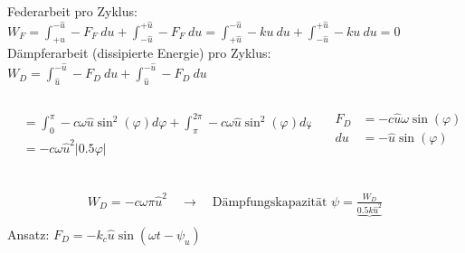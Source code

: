 \begin{frame}
        Federarbeit pro Zyklus: \\
        $W_F = \int_{+u}^{-\hat{u}} -F_F \ du + \int_{-\hat{u}}^{+\hat{u}} -F_F \ du 
        = \int_{+\hat{u}}^{-\hat{u}} -ku \ du + \int_{-\hat{u}}^{+\hat{u}} -ku \ du = 0$ \\
        Dämpferarbeit (dissipierte Energie) pro Zyklus: \\
        $W_D = \int_{\hat{u}}^{-\hat{u}} -F_D \ du + \int_{\hat{u}}^{-\hat{u}} -F_D \ du$ \\
        \begin{columns}
                \begin{column}[t]{.7 \textwidth}
                        \begin{align*}
                                &= \int_{0}^{\pi} -c \omega \hat{u} \sin^{2}(\varphi) d\varphi
                                + \int_{\pi}^{2\pi} -c \omega \hat{u} \sin^{2}(\varphi) d\varphi \\
                                &= -c \omega \hat{u}^2 |0.5 \varphi| \\
                        \end{align*}
                \end{column}
                \begin{column}[t]{.3 \textwidth}
                        \begin{align*}
                                F_D &= -c\hat{u} \omega \sin(\varphi)\\
                                du &= -\hat{u} \sin(\varphi)\\        
                        \end{align*}       
                \end{column}
        \end{columns}        
\end{frame}

\begin{frame}
        \begin{align*}
                W_D = -c \omega \pi \hat{u}^2 \quad \rightarrow \quad
                \text{Dämpfungskapazität }\psi = \frac{W_D}{\underbrace{0.5 k \hat{u}^2}}\\
        \end{align*}
        Ansatz: $F_D = -k_c \hat{u} \sin(\omega t - \psi_u)$ \\
         \\
\end{frame}

